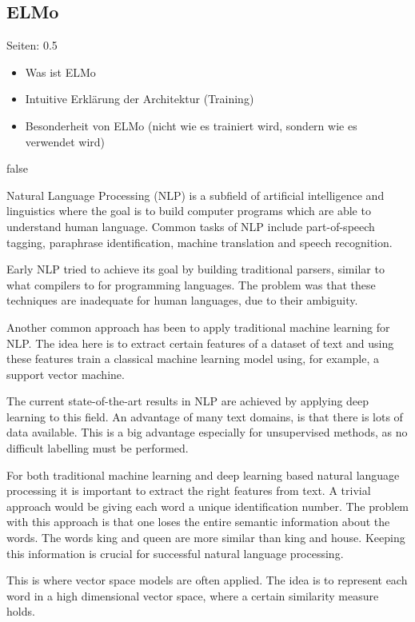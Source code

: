 \documentclass[draft,final,oneside]{vutinfth} %
\begin{document}
\subsection{ELMo}

Seiten: 0.5

\begin{itemize}
\item Was ist ELMo
\item Intuitive Erklärung der Architektur (Training)
\item Besonderheit von ELMo (nicht wie es trainiert wird, sondern wie es verwendet wird)
\end{itemize}


\if false

Natural Language Processing (NLP) is a subfield of artificial intelligence and linguistics where the goal is to build computer programs which are able to understand human language. Common tasks of NLP include part-of-speech tagging, paraphrase identification, machine translation and speech recognition.

Early NLP tried to achieve its goal by building traditional parsers, similar to what compilers to for programming languages. The problem was that these techniques are inadequate for human languages, due to their ambiguity.

Another common approach has been to apply traditional machine learning for NLP. The idea here is to extract certain features of a dataset of text and using these features train a classical machine learning model using, for example, a support vector machine.

The current state-of-the-art results in NLP are achieved by applying deep learning to this field. An advantage of many text domains, is that there is lots of data available. This is a big advantage especially for unsupervised methods, as no difficult labelling must be performed.

For both traditional machine learning and deep learning based natural language processing it is important to extract the right features from text. A trivial approach would be giving each word a unique identification number. The problem with this approach is that one loses the entire semantic information about the words. The words king and queen are more similar than king and house. Keeping this information is crucial for successful natural language processing.

This is where vector space models are often applied. The idea is to represent each word in a high dimensional vector space, where a certain similarity measure holds.
\end{document}
